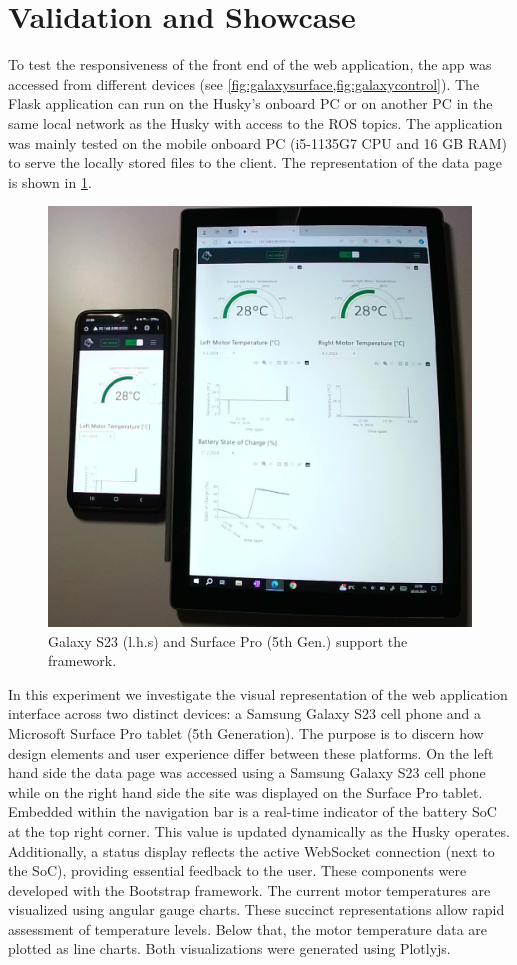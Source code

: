 \documentclass[conference]{IEEEtran}
\begin{document}
\section{Validation and Showcase}\label{VS}
To test the responsiveness of the front end of the web application, the app was accessed from different devices (see \cref{fig:galaxysurface,fig:galaxycontrol}). The Flask application can run on the Husky's onboard PC or on another PC in the same local network as the Husky with access to the ROS topics. The application was mainly tested on the mobile onboard PC (i5-1135G7 CPU and 16 GB RAM) to serve the locally stored files to the client.
The representation of the data page is shown in \cref{fig:galaxysurface}. 
\begin{figure}[b]
    \centerline{\includegraphics[width=6.cm, height=5.cm]{Pictures/galaxysurfacecut.png}}
    \caption{Galaxy S23  (l.h.s) and Surface Pro (5th Gen.) support the framework.}
    \label{fig:galaxysurface}
\end{figure}
In this experiment we investigate the visual representation of the web application interface across two distinct devices: a Samsung Galaxy S23 cell phone and a Microsoft Surface Pro tablet (5th Generation). The purpose is to discern how design elements and user experience differ between these platforms.
On the left hand side the data page was accessed using a Samsung Galaxy S23 cell phone while on the right hand side the site was displayed on the Surface Pro tablet.
Embedded within the navigation bar is a real-time indicator of the battery SoC at the top right corner. This value is updated dynamically as the Husky operates.
Additionally, a status display reflects the active WebSocket connection (next to the SoC), providing essential feedback to the user.
These components were developed with the Bootstrap framework. The current motor temperatures are visualized using angular gauge charts. These succinct representations allow rapid assessment of temperature levels.
Below that, the motor temperature data are plotted as line charts. Both visualizations were generated using Plotlyjs.
\end{document}
